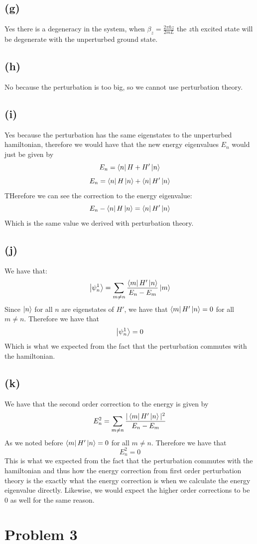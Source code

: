 \documentclass[11pt]{article}
\begin{document}
\subsection*{(g)}
Yes there is a degeneracy in the system, when 
$\beta_z = \frac{2\pi\hbar z}{2mL}$ the $z$th excited state will 
be degenerate with the unperturbed ground state.
\subsection*{(h)}
No because the perturbation is too big, so we 
cannot use perturbation theory.
\subsection*{(i)}
Yes because the perturbation has the same eigenstates to 
the unperturbed hamiltonian, therefore we would have that the 
new energy eigenvalues $E_n$ would just be given by 
$$E_{n} = \bra{n}H+H'\ket{n}$$
$$E_{n} = \bra{n}H\ket{n} + \bra{n}H'\ket{n}$$
THerefore we can see the correction to the energy eigenvalue:
$$E_{n}-\bra{n}H\ket{n} = \bra{n}H'\ket{n}$$
Which is the same value we derived with 
perturbation theory.
\subsection*{(j)}
We have that:
$$\ket{\psi_n^{1}}= \sum_{m\neq n}\frac{\bra{m}H'\ket{n}}{E_n-E_m}\ket{m}$$
Since $\ket{n}$ for all $n$ are eigenstates of $H'$, we have that 
$\bra{m}H'\ket{n} = 0$ for all $m\neq n$. Therefore we have that
$$\ket{\psi_n^{1}}= 0$$
Which is what we expected from the fact that the perturbation commutes 
with the hamiltonian.
\subsection*{(k)}
We have that the second order correction to the energy is given by
$$E_{n}^2 = \sum_{m\neq n}\frac{|\bra{m}H'\ket{n}|^2}{E_n-E_m}$$
As we noted before $\bra{m}H'\ket{n} = 0$ for all $m\neq n$. Therefore we have that
$$E_{n}^2 = 0$$
This is what we expected from the fact that the perturbation commutes with the hamiltonian
and thus how the energy correction from first order perturbation theory is the exactly
what the energy correction is when we calculate the energy eigenvalue directly. Likewise, 
we would expect the higher order corrections to be $0$ as well for the same reason.
\section*{Problem 3}
\end{document}
